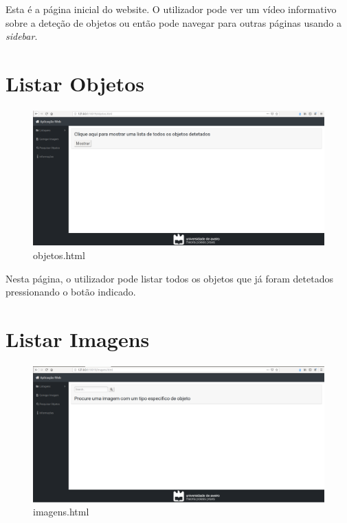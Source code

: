 \documentclass{report}
\begin{document}
Esta é a página inicial do website. O utilizador pode ver um vídeo informativo sobre a deteção de objetos ou então pode navegar para outras páginas usando a \textit{sidebar}.


\section{Listar Objetos}
\paragraph{}

\begin{figure}[H]
\centering
\includegraphics[width=1\linewidth]{objetos.png}
\caption{objetos.html}
\end{figure}

Nesta página, o utilizador pode listar todos os objetos que já foram detetados pressionando o botão indicado.


\section{Listar Imagens}
\paragraph{}

\begin{figure}[H]
\centering
\includegraphics[width=1\linewidth]{imagens.png}
\caption{imagens.html}
\end{figure}
\end{document}
